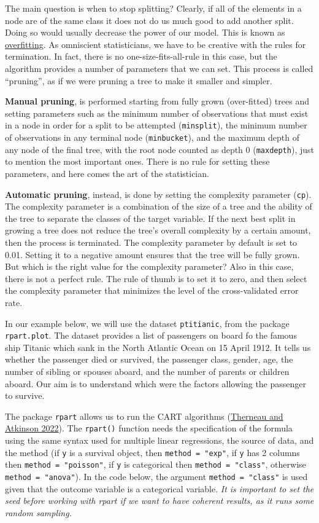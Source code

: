 \documentclass[
]{article}
\begin{document}
The main question is when to stop splitting? Clearly, if all of the
elements in a node are of the same class it does not do us much good to
add another split. Doing so would usually decrease the power of our
model. This is known as \ul{overfitting}. As omniscient
statisticians, we have to be creative with the rules for termination. In
fact, there is no one-size-fits-all-rule in this case, but the algorithm
provides a number of parameters that we can set. This process is called
``pruning'', as if we were pruning a tree to make it smaller and simpler.

\textbf{Manual pruning}, is performed starting from fully grown (over-fitted)
trees and setting parameters such as the minimum number of observations
that must exist in a node in order for a split to be attempted
(\texttt{minsplit}), the minimum number of observations in any terminal node
(\texttt{minbucket}), and the maximum depth of any node of the final tree, with
the root node counted as depth 0 (\texttt{maxdepth}), just to mention the most
important ones. There is no rule for setting these parameters, and here
comes the art of the statistician.

\textbf{Automatic pruning}, instead, is done by setting the complexity
parameter (\texttt{cp}). The complexity parameter is a combination of the size
of a tree and the ability of the tree to separate the classes of the
target variable. If the next best split in growing a tree does not
reduce the tree's overall complexity by a certain amount, then the
process is terminated. The complexity parameter by default is set to
0.01. Setting it to a negative amount ensures that the tree will be
fully grown. But which is the right value for the complexity parameter?
Also in this case, there is not a perfect rule. The rule of thumb is to
set it to zero, and then select the complexity parameter that minimizes
the level of the cross-validated error rate.

In our example below, we will use the dataset \texttt{ptitianic}, from the
package \texttt{rpart.plot}. The dataset provides a list of passengers on board
fo the famous ship Titanic which sank in the North Atlantic Ocean on 15
April 1912. It tells us whether the passenger died or survived, the
passenger class, gender, age, the number of sibling or spouses aboard,
and the number of parents or children aboard. Our aim is to understand
which were the factors allowing the passenger to survive.

The package \texttt{rpart} allows us to run the CART algorithms
(\protect\hyperlink{ref-therneau2022}{Therneau and Atkinson 2022}). The \texttt{rpart()} function needs the specification of the
formula using the same syntax used for multiple linear regressions, the
source of data, and the method (if \texttt{y} is a survival object, then
\texttt{method\ =\ "exp"}, if \texttt{y} has 2 columns then \texttt{method\ =\ "poisson"}, if \texttt{y}
is categorical then \texttt{method\ =\ "class"}, otherwise \texttt{method\ =\ "anova"}).
In the code below, the argument \texttt{method\ =\ "class"} is used given that
the outcome variable is a categorical variable. \emph{It is important to set
the seed before working with rpart if we want to have coherent results,
as it runs some random sampling.}
\end{document}
